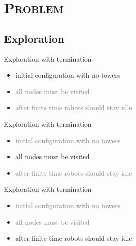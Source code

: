 \documentclass[xcolor=x11names,compress]{beamer}
\makeatletter
\let\beamer@writeslidentry@miniframeson=\beamer@writeslidentry
\def\beamer@writeslidentry@miniframesoff{%
  \expandafter\beamer@ifempty\expandafter{\beamer@framestartpage}{}%
  {%
    \clearpage\beamer@notesactions%
  }
}
\newcommand*{\miniframeson}{\let\beamer@writeslidentry=\beamer@writeslidentry@miniframeson}
\newcommand*{\miniframesoff}{\let\beamer@writeslidentry=\beamer@writeslidentry@miniframesoff}
\renewcommand{\(}{\begin{columns}}
\renewcommand{\)}{\end{columns}}
\newcommand{\<}[1]{\begin{column}{#1}}
\renewcommand{\>}{\end{column}}
\makeatother
\begin{document}
\miniframeson
\section{\scshape Problem}
\subsection{Exploration}
\begin{frame}{Exploration with termination}
\begin{itemize}
 \item initial configuration with no towers
 \item \textcolor{gray}{all nodes must be visited}
 \item \textcolor{gray}{after finite time robots should stay idle}
\end{itemize}
\end{frame}
\miniframesoff
\begin{frame}{Exploration with termination}
\begin{itemize}
 \item \textcolor{gray}{initial configuration with no towers}
 \item all nodes must be visited
 \item \textcolor{gray}{after finite time robots should stay idle}
\end{itemize}
\end{frame}

\begin{frame}{Exploration with termination}
\begin{itemize}
 \item \textcolor{gray}{initial configuration with no towers}
 \item \textcolor{gray}{all nodes must be visited}
 \item after finite time robots should stay idle
\end{itemize}
\end{frame}
\miniframeson
\end{document}
